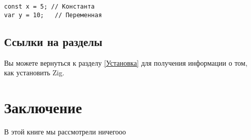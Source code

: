 \documentclass[a4paper, twoside, openany]{book}
\begin{document}
\begin{lstlisting}
const x = 5; // Константа
var y = 10;   // Переменная
\end{lstlisting}

\section{Ссылки на разделы}
 \fontsize{14pt}{14pt}\selectfont
Вы можете вернуться к разделу \ref{Установка} для получения информации о том, как установить Zig.

\chapter{Заключение}
 \fontsize{14pt}{14pt}\selectfont
В этой книге мы рассмотрели ничегооо 
\end{document}
